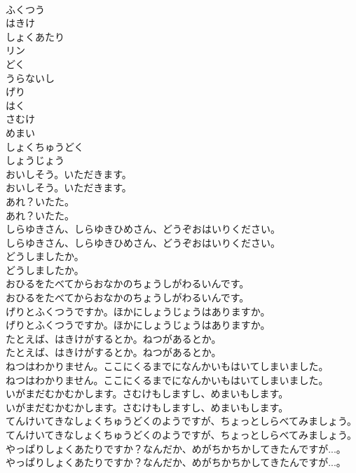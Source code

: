 \documentclass[8pt]{extreport}
\begin{document}
\begin{CJK}{UTF8}{min}
\\	ふくつう
\\	はきけ
\\	しょくあたり
\\	リン
\\	どく
\\	うらないし
\\	げり
\\	はく
\\	さむけ
\\	めまい
\\	しょくちゅうどく
\\	しょうじょう
\\	おいしそう。いただきます。	
\\	おいしそう。いただきます。 
\\	あれ？いたた。	
\\	あれ？いたた。 
\\	しらゆきさん、しらゆきひめさん、どうぞおはいりください。	
\\	しらゆきさん、しらゆきひめさん、どうぞおはいりください。 
\\	どうしましたか。	
\\	どうしましたか。 
\\	おひるをたべてからおなかのちょうしがわるいんです。	
\\	おひるをたべてからおなかのちょうしがわるいんです。 
\\	げりとふくつうですか。ほかにしょうじょうはありますか。	
\\	げりとふくつうですか。ほかにしょうじょうはありますか。 
\\	たとえば、はきけがするとか。ねつがあるとか。	
\\	たとえば、はきけがするとか。ねつがあるとか。 
\\	ねつはわかりません。ここにくるまでになんかいもはいてしまいました。	
\\	ねつはわかりません。ここにくるまでになんかいもはいてしまいました。 
\\	いがまだむかむかします。さむけもしますし、めまいもします。	
\\	いがまだむかむかします。さむけもしますし、めまいもします。 
\\	てんけいてきなしょくちゅうどくのようですが、ちょっとしらべてみましょう。	
\\	てんけいてきなしょくちゅうどくのようですが、ちょっとしらべてみましょう。 
\\	やっぱりしょくあたりですか？なんだか、めがちかちかしてきたんですが...。	
\\	やっぱりしょくあたりですか？なんだか、めがちかちかしてきたんですが...。 

\end{CJK}
\end{document}

